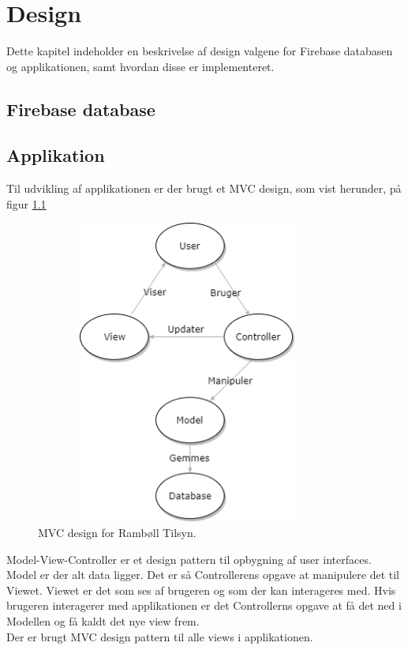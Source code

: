 \chapter{Design}
Dette kapitel indeholder en beskrivelse af design valgene for Firebase databasen og applikationen, samt hvordan disse er implementeret. \\

\section{Firebase database}

\section{Applikation}
Til udvikling af applikationen er der brugt et MVC design, som vist herunder, på figur \ref{fig:MVC}
\begin{figure}[H] %
	\centering
	\includegraphics[height=10cm, width=10cm]{../ArkitekturDesign/Design/MVC}
	\caption{MVC design for Rambøll Tilsyn.}
	\label{fig:MVC}
\end{figure}

Model-View-Controller er et design pattern til opbygning af user interfaces. Model er der alt
data ligger. Det er så Controllerens opgave at manipulere det til Viewet. Viewet er det som
ses af brugeren og som der kan interageres med. Hvis brugeren interagerer med applikationen er
det Controllerns opgave at få det ned i Modellen og få kaldt det nye view frem. \\
Der er brugt MVC design pattern til alle views i applikationen.

\clearpage


